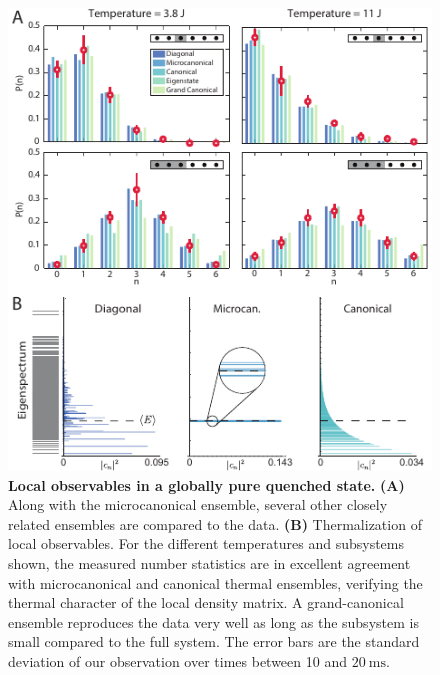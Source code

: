 \begin{figure}[t]
	\centering
	\includegraphics[scale=1.2]{figures/ETH_localDistr.pdf}
	\caption{{\bf Local observables in a globally pure quenched state. } {\bf (A)} Along with the microcanonical ensemble, several other closely related ensembles are compared to the data. {\bf (B)} Thermalization of local observables. For the different temperatures and subsystems shown, the measured number statistics are in excellent agreement with microcanonical and canonical thermal ensembles, verifying the thermal character of the local density matrix. A grand-canonical ensemble reproduces the data very well as long as the subsystem is small compared to the full system. The error bars are the standard deviation of our observation over times between 10 and $20~\mathrm{ms}$.}
	\label{fig:ETH_Ensembles}
\end{figure}

